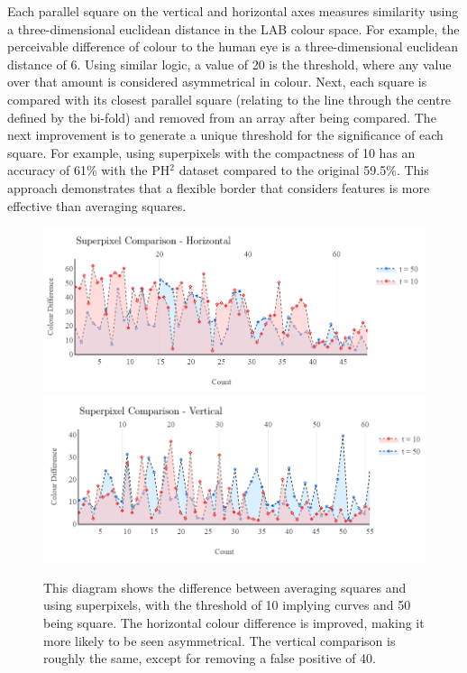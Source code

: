 Each parallel square on the vertical and horizontal axes measures similarity using a three-dimensional euclidean distance in the LAB colour space. For example, the perceivable difference of colour to the human eye is a three-dimensional euclidean distance of 6\cite{Myridis2014a}. Using similar logic, a value of 20 is the threshold, where any value over that amount is considered asymmetrical in colour. Next, each square is compared with its closest parallel square (relating to the line through the centre defined by the bi-fold) and removed from an array after being compared. The next improvement is to generate a unique threshold for the significance of each square. For example, using superpixels with the compactness of 10 has an accuracy of 61\% with the PH$^2$ dataset compared to the original 59.5\%. This approach demonstrates that a flexible border that considers features is more effective than averaging squares.

\begin{figure}
\centering
\includegraphics[scale=0.7]{images/superpixel2.png}
\includegraphics[scale=0.7]{images/superpixel1.png}
\caption{This diagram shows the difference between averaging squares and using superpixels, with the threshold of 10 implying curves and 50 being square. The horizontal colour difference is improved, making it more likely to be seen asymmetrical. The vertical comparison is roughly the same, except for removing a false positive of 40.}
\end{figure} \label{asy3}


